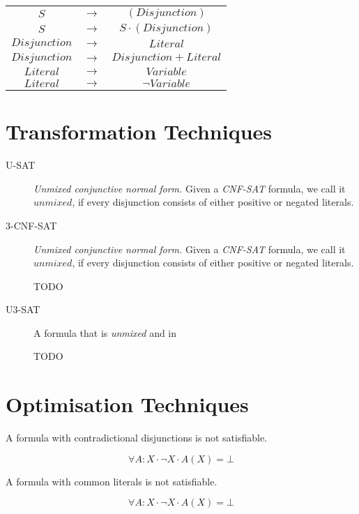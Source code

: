 \documentclass[12pt, letterpaper]{article}
\begin{document}
\begin{description}
{            \begin{tabular}{ccc}
                $S$ & $\rightarrow$& $(Disjunction)$ \\ 
                $S$ & $\rightarrow$& $S \cdot (Disjunction)$ \\ 
                $Disjunction$ & $\rightarrow$& $Literal$ \\ 
                $Disjunction$ & $\rightarrow$& $Disjunction + Literal$ \\ 
                $Literal$ & $\rightarrow$& $Variable$ \\ 
                $Literal$ & $\rightarrow$& $\lnot Variable$ \\ 
            \end{tabular}
        }
    \end{description}

    \section{Transformation Techniques}

    \begin{description}
        \item[U-SAT] {
            \emph{Unmixed conjunctive normal form.} Given a
            \emph{CNF-SAT} formula, we call it $unmixed$, if
            every disjunction consists of either positive or 
            negated literals.
        }
        \item[3-CNF-SAT] {
            \emph{Unmixed conjunctive normal form.} Given a
            \emph{CNF-SAT} formula, we call it $unmixed$, if
            every disjunction consists of either positive or 
            negated literals.
            
            TODO
        }
        \item[U3-SAT] {
            A formula that is \emph{unmixed} and in \emph{}
            
            TODO
        }
    \end{description}

    \section{Optimisation Techniques}

    \begin{description} {
        \item[Contradiction.]

            A formula with contradictional disjunctions
            is not satisfiable.
            
            \[\forall A : X \cdot \lnot X \cdot A(X) = \bot \]
        }
        \item[Common Literals.] {
            A formula with common literals
            is not satisfiable.
            
            \[\forall A : X \cdot \lnot X \cdot A(X) = \bot \]
        }
    \end{description}
\end{document}
